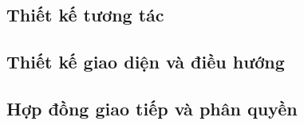 \subsection{Thiết kế tương tác}
\par\noindent\mbox{}\par\vspace{2mm}

\subsection{Thiết kế giao diện và điều hướng}
\par\noindent\mbox{}\par\vspace{2mm}

\subsection{Hợp đồng giao tiếp và phân quyền}
\par\noindent\mbox{}\par\vspace{2mm}
